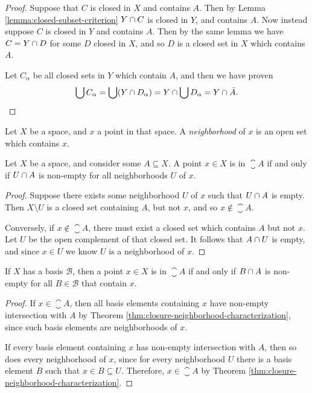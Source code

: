\begin{proof}
    Suppose that $C$ is closed in $X$ and contains $A$. Then by Lemma \ref{lemma:closed-subset-criterion} $Y \cap C$ is closed in $Y$, and contains $A$. Now instead suppose $C$ is closed in $Y$ and contains $A$. Then by the same lemma we have $C = Y \cap D$ for some $D$ closed in $X$, and so $D$ is a closed set in $X$ which contains $A$.

    Let $C_{\alpha}$ be all closed sets in $Y$ which contain $A$, and then we have proven
    \begin{align*}
        \bigcup C_{\alpha} = \bigcup (Y \cap D_{\alpha}) = Y \cap \bigcup D_{\alpha} = Y \cap \bar{A}.
    \end{align*}
\end{proof}

\begin{defn}
    Let $X$ be a space, and $x$ a point in that space. A \emph{neighborhood} of $x$ is an open set which contains $x$.
\end{defn}

\begin{thm}\label{thm:closure-neighborhood-characterization}
    Let $X$ be a space, and consider some $A \subseteq X$. A point $x \in X$ is in $\closure{A}$ if and only if $U \cap A$ is non-empty for all neighborhoods $U$ of $x$.
\end{thm}

\begin{proof}
    Suppose there exists some neighborhood $U$ of $x$ such that $U \cap A$ is empty. Then $X \setminus U$ is a closed set containing $A$, but not $x$, and so $x \not\in \closure{A}$.

    Conversely, if $x \not\in \closure{A}$, there must exist a closed set which contains $A$ but not $x$. Let $U$ be the open complement of that closed set. It follows that $A \cap U$ is empty, and since $x \in U$ we know $U$ is a neighborhood of $x$.
\end{proof}

\begin{cor}
    If $X$ has a basis $\mathcal{B}$, then a point $x \in X$ is in $\closure{A}$ if and only if $B \cap A$ is non-empty for all $B \in \mathcal{B}$ that contain $x$.
\end{cor}

\begin{proof}
    If $x \in \closure{A}$, then all basis elements containing $x$ have non-empty intersection with $A$ by Theorem \ref{thm:closure-neighborhood-characterization}, since such basis elements are neighborhoods of $x$.

    If every basis element containing $x$ has non-empty intersection with $A$, then so does every neighborhood of $x$, since for every neighborhood $U$ there is a basis element $B$ such that $x \in B \subseteq U$. Therefore, $x \in \closure{A}$ by Theorem \ref{thm:closure-neighborhood-characterization}.
\end{proof}

